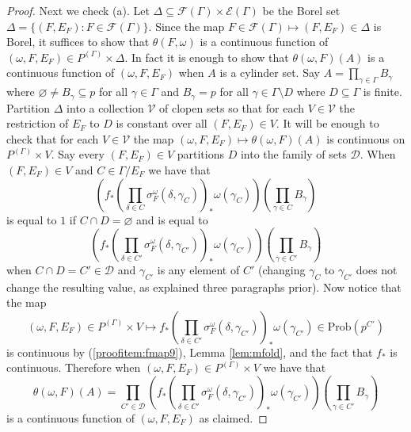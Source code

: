 \documentclass[10pt,a4paper]{amsart}
\def\cal{\mathcal}
\newcommand{\Prob}{\mathrm{Prob}}
\begin{document}
\begin{proof}
	Next we check (a). Let $\Delta \subseteq \cal F(\Gamma) \times \cal E(\Gamma)$ be the Borel set $\Delta = \{(F, E_F) : F \in \cal F(\Gamma)\}$. Since the map $F \in \cal F(\Gamma) \mapsto (F, E_F) \in \Delta$ is Borel, it suffices to show that $\theta(F, \omega)$ is a continuous function of $(\omega, F, E_F) \in P^{(\Gamma)} \times \Delta$. In fact it is enough to show that $\theta(\omega, F)(A)$ is a continuous function of $(\omega, F, E_F)$ when $A$ is a cylinder set. Say $A = \prod_{\gamma \in \Gamma} B_\gamma$ where $\varnothing \neq B_\gamma \subseteq p$ for all $\gamma \in \Gamma$ and $B_\gamma = p$ for all $\gamma \in \Gamma \setminus D$ where $D \subseteq \Gamma$ is finite. Partition $\Delta$ into a collection $\cal V$ of clopen sets so that for each $V \in \cal V$ the restriction of $E_F$ to $D$ is constant over all $(F, E_F) \in V$. It will be enough to check that for each $V \in \cal V$ the map $(\omega, F, E_F) \mapsto \theta(\omega, F)(A)$ is continuous on $P^{(\Gamma)} \times V$. Say every $(F, E_F) \in V$ partitions $D$ into the family of sets $\cal D$. When $(F, E_F) \in V$ and $C \in \Gamma / E_F$ we have that
	\[\left(f_* \left( \prod_{\delta \in C} \sigma^\omega_F(\delta, \gamma_C) \right)_* \omega(\gamma_C) \right) \left(\prod_{\gamma \in C} B_\gamma\right)\]
	is equal to $1$ if $C \cap D = \varnothing$ and is equal to
	\[\left(f_* \left( \prod_{\delta \in C'} \sigma^\omega_F(\delta, \gamma_{C'}) \right)_* \omega(\gamma_{C'}) \right) \left(\prod_{\gamma \in C'} B_\gamma \right)\]
	when $C \cap D = C' \in \cal D$ and $\gamma_{C'}$ is any element of $C'$ (changing $\gamma_C$ to $\gamma_{C'}$ does not change the resulting value, as explained three paragraphs prior). Now notice that the map
	\[(\omega, F, E_F) \in P^{(\Gamma)} \times V \mapsto f_* \left( \prod_{\delta \in C'} \sigma^\omega_F(\delta, \gamma_{C'}) \right)_* \omega(\gamma_{C'}) \in \Prob(p^{C'})\]
	is continuous by (\ref{proofitem:fmap9}), Lemma \ref{lem:mfold}, and the fact that $f_*$ is continuous. Therefore when $(\omega, F, E_F) \in P^{(\Gamma)} \times V$ we have that
	\[\theta(\omega, F)(A) = \prod_{C' \in \cal D} \left(f_* \left( \prod_{\delta \in C'} \sigma^\omega_F(\delta, \gamma_{C'}) \right)_* \omega(\gamma_{C'}) \right) \left(\prod_{\gamma \in C'} B_\gamma \right)\]
	is a continuous function of $(\omega, F, E_F)$ as claimed.
	

\end{proof}
\end{document}
